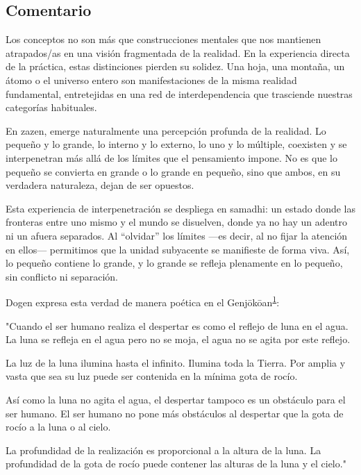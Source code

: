 \documentclass[
  a5paperpaper,
]{article}
\begin{document}
\hfill\break

\hypertarget{comentario-65}{%
\subsection{Comentario}\label{comentario-65}}

Los conceptos no son más que construcciones mentales que nos mantienen
atrapados/as en una visión fragmentada de la realidad. En la experiencia
directa de la práctica, estas distinciones pierden su solidez. Una hoja,
una montaña, un átomo o el universo entero son manifestaciones de la
misma realidad fundamental, entretejidas en una red de interdependencia
que trasciende nuestras categorías habituales.

En zazen, emerge naturalmente una percepción profunda de la realidad. Lo
pequeño y lo grande, lo interno y lo externo, lo uno y lo múltiple,
coexisten y se interpenetran más allá de los límites que el pensamiento
impone. No es que lo pequeño se convierta en grande o lo grande en
pequeño, sino que ambos, en su verdadera naturaleza, dejan de ser
opuestos.

Esta experiencia de interpenetración se despliega en samadhi: un estado
donde las fronteras entre uno mismo y el mundo se disuelven, donde ya no
hay un adentro ni un afuera separados. Al ``olvidar'' los límites ---es
decir, al no fijar la atención en ellos--- permitimos que la unidad
subyacente se manifieste de forma viva. Así, lo pequeño contiene lo
grande, y lo grande se refleja plenamente en lo pequeño, sin conflicto
ni separación.

Dogen expresa esta verdad de manera poética en el
Genjōkōan\textsuperscript{\protect\hypertarget{ref1}{\protect\hyperlink{nota1}{1}}}:

"Cuando el ser humano realiza el despertar es como el reflejo de luna en
el agua. La luna se refleja en el agua pero no se moja, el agua no se
agita por este reflejo.

La luz de la luna ilumina hasta el infinito. Ilumina toda la Tierra. Por
amplia y vasta que sea su luz puede ser contenida en la mínima gota de
rocío.

Así como la luna no agita el agua, el despertar tampoco es un obstáculo
para el ser humano. El ser humano no pone más obstáculos al despertar
que la gota de rocío a la luna o al cielo.

La profundidad de la realización es proporcional a la altura de la luna.
La profundidad de la gota de rocío puede contener las alturas de la luna
y el cielo."
\end{document}
